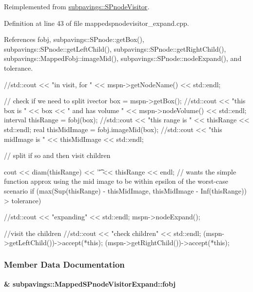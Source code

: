 \-Reimplemented from \hyperlink{classsubpavings_1_1SPnodeVisitor_ab66d7c252cd58fc14214315033521a80}{subpavings\-::\-S\-Pnode\-Visitor}.



\-Definition at line 43 of file mappedspnodevisitor\-\_\-expand.\-cpp.



\-References fobj, subpavings\-::\-S\-Pnode\-::get\-Box(), subpavings\-::\-S\-Pnode\-::get\-Left\-Child(), subpavings\-::\-S\-Pnode\-::get\-Right\-Child(), subpavings\-::\-Mapped\-Fobj\-::image\-Mid(), subpavings\-::\-S\-Pnode\-::node\-Expand(), and tolerance.


\begin{DoxyCode}
{

  //std::cout << "in visit, for " << mspn->getNodeName() << std::endl;

  // check if we need to split
  ivector box = mspn->getBox();
  //std::cout << "this box is " << box << " and has volume " <<
       mspn->nodeVolume() << std::endl;
  interval thisRange = fobj(box);
  //std::cout << "this range is " << thisRange << std::endl;
  real thisMidImage = fobj.imageMid(box);
  //std::cout << "this midImage is " << thisMidImage << std::endl;
  
  // split if so and then visit children
  
cout << diam(thisRange) << '\t' << thisRange << endl;
  // wants the simple function approx using the mid image to be within epsilon
       of the worst-case scenario
  if (max(Sup(thisRange) - thisMidImage, thisMidImage - Inf(thisRange)) > 
      tolerance) {
    //std::cout << "expanding" << std::endl;
    mspn->nodeExpand();

    //visit the children
    //std::cout << "check children" << std::endl;
    (mspn->getLeftChild())->accept(*this);
    (mspn->getRightChild())->accept(*this);
  }
}
\end{DoxyCode}


\subsubsection{\-Member \-Data \-Documentation}
\hypertarget{classsubpavings_1_1MappedSPnodeVisitorExpand_a7c071f0df7b4dd7fd009827da8853d35}{
\paragraph[{fobj}]{\& {\bf subpavings\-::\-Mapped\-S\-Pnode\-Visitor\-Expand\-::fobj}}}\label{classsubpavings_1_1MappedSPnodeVisitorExpand_a7c071f0df7b4dd7fd009827da8853d35}


